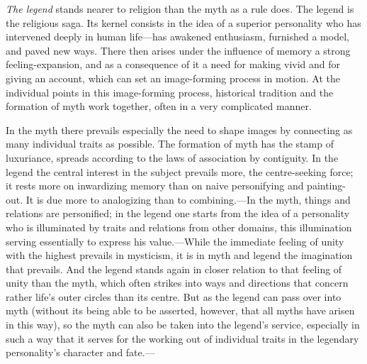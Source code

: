\documentclass[12pt,a4paper]{book}
\begin{document}
\emph{The legend} stands nearer to religion than the myth as a rule does. The legend is the
religious saga. Its kernel consists in the idea of a superior personality who has intervened
deeply in human life---has awakened enthusiasm, furnished a model, and paved new ways. There
then arises under the influence of memory a strong feeling-expansion, and as a consequence of
it a need for making vivid and for giving an account, which can set an image-forming process
in motion. At the individual points in this image-forming process, historical tradition and
the formation of myth work together, often in a very complicated manner.

In the myth there prevails especially the need to shape images by connecting as many individual
traits as possible. The formation of myth has the stamp of luxuriance, spreads according to the
laws of association by contiguity. In the legend the central interest in the subject prevails
more, the centre-seeking force; it rests more on inwardizing memory than on naive personifying
and painting-out. It is due more to analogizing than to combining.---In the myth, things and
relations are personified; in the legend one starts from the idea of a personality who is
illuminated by traits and relations from other domains, this illumination serving essentially to
express his value.---While the immediate feeling of unity with the highest prevails in mysticism,
it is in myth and legend the imagination that prevails. And the legend stands again in closer
relation to that feeling of unity than the myth, which often strikes into ways and directions
that concern rather life's outer circles than its centre. But as the legend can pass over into
myth (without its being able to be asserted, however, that all myths have arisen in this way), so
the myth can also be taken into the legend's service, especially in such a way that it serves for
the working out of individual traits in the legendary personality's character and fate.---
\end{document}
